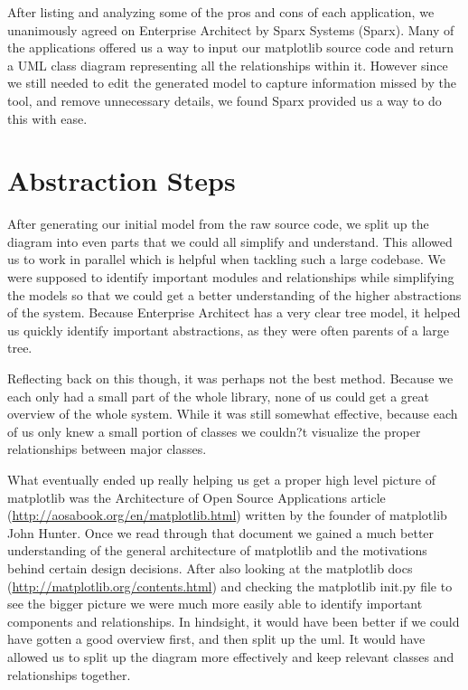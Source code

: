 \documentclass[pdftex,10pt,a4paper]{report}
\begin{document}
After listing and analyzing some of the pros and cons of each application, we unanimously agreed on Enterprise Architect by Sparx Systems (Sparx). Many of the applications offered us a way to input our matplotlib source code and return a UML class diagram representing all the relationships within it. However since we still needed to edit the generated model to capture information missed by the tool, and remove unnecessary details, we found Sparx provided us a way to do this with ease.


\section{Abstraction Steps}

After generating our initial model from the raw source code, we split up the diagram into even parts that we could all simplify and understand. This allowed us to work in parallel which is helpful when tackling such a large codebase. We were supposed to identify important modules and relationships while simplifying the models so that we could get a better understanding of the higher abstractions of the system. Because Enterprise Architect has a very clear tree model, it helped us quickly identify important abstractions, as they were often parents of a large tree.

Reflecting back on this though, it was perhaps not the best method. Because we each only had a small part of the whole library, none of us could get a great overview of the whole system. While it was still somewhat effective, because each of us only knew a small portion of classes we couldn?t visualize the proper relationships between major classes. 

What eventually ended up really helping us get a proper high level picture of matplotlib was the Architecture of Open Source Applications article (\url{http://aosabook.org/en/matplotlib.html}) written by the founder of matplotlib John Hunter. Once we read through that document we gained a much better understanding of the general architecture of matplotlib and the motivations behind certain design decisions. After also looking at the matplotlib docs (\url{http://matplotlib.org/contents.html}) and checking the matplotlib init.py file to see the bigger picture we were much more easily able to identify important components and relationships. In hindsight, it would have been better if we could have gotten a good overview first, and then split up the uml. It would have allowed us to split up the diagram more effectively and keep relevant classes and relationships together.
\end{document}
